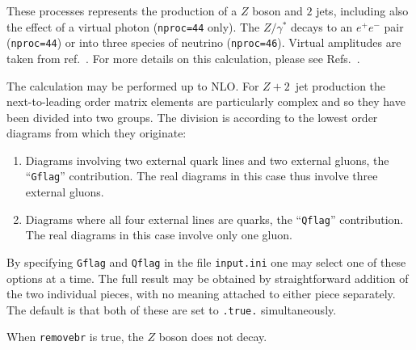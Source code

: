 \label{subsec:z2jets}

These processes represents the production of a $Z$ boson and $2$ jets,
including also the effect of a virtual photon ({\tt nproc=44} only). The $Z/\gamma^*$ decays
to an $e^+ e^-$ pair ({\tt nproc=44}) or into three species of neutrino ({\tt nproc=46}).
Virtual amplitudes are taken from ref.~\cite{Bern:1997sc}.
For more details on this calculation, please see
Refs.~\cite{Campbell:2002tg,Campbell:2003hd}.

The calculation may be performed up to NLO.
For $Z+2$~jet production
the next-to-leading order matrix elements are
particularly complex and so they have been divided into two groups.
The division is according to the lowest order diagrams from which they
originate:
\begin{enumerate}
\item Diagrams involving two external quark lines and two external gluons,
the ``{\tt Gflag}'' contribution. The real diagrams in this case thus
involve three external gluons.

\item Diagrams where all four external lines are quarks,
the ``{\tt Qflag}'' contribution. The real diagrams in this case
involve only one gluon.
\end{enumerate}

By specifying {\tt Gflag} and {\tt Qflag} in the file {\tt input.ini} one may
select one of these options at a time. The full result may be obtained
by straightforward addition of the two individual pieces, with no
meaning attached to either piece separately.
The default is that both of these are set to {\tt .true.} simultaneously.

When {\tt removebr} is true, the $Z$ boson does not decay.
